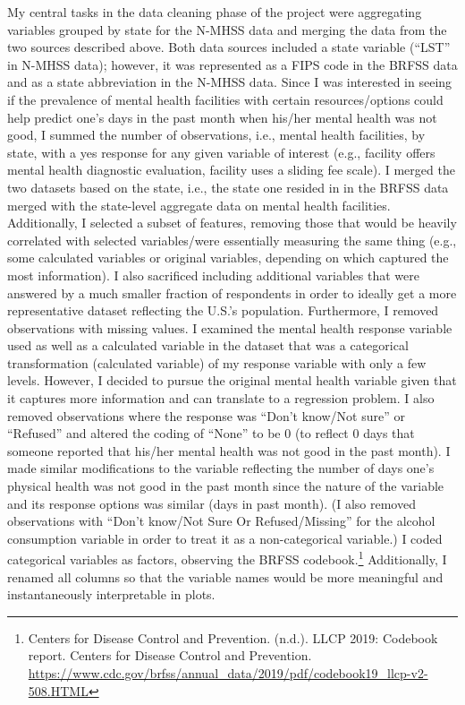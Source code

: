 \documentclass[
]{article}
\begin{document}
My central tasks in the data cleaning phase of the project were aggregating variables grouped by state for the N-MHSS data and merging the data from the two sources described above. Both data sources included a state variable (``LST'' in N-MHSS data); however, it was represented as a FIPS code in the BRFSS data and as a state abbreviation in the N-MHSS data. Since I was interested in seeing if the prevalence of mental health facilities with certain resources/options could help predict one's days in the past month when his/her mental health was not good, I summed the number of observations, i.e., mental health facilities, by state, with a yes response for any given variable of interest (e.g., facility offers mental health diagnostic evaluation, facility uses a sliding fee scale). I merged the two datasets based on the state, i.e., the state one resided in in the BRFSS data merged with the state-level aggregate data on mental health facilities. Additionally, I selected a subset of features, removing those that would be heavily correlated with selected variables/were essentially measuring the same thing (e.g., some calculated variables or original variables, depending on which captured the most information). I also sacrificed including additional variables that were answered by a much smaller fraction of respondents in order to ideally get a more representative dataset reflecting the U.S.'s population. Furthermore, I removed observations with missing values. I examined the mental health response variable used as well as a calculated variable in the dataset that was a categorical transformation (calculated variable) of my response variable with only a few levels. However, I decided to pursue the original mental health variable given that it captures more information and can translate to a regression problem. I also removed observations where the response was ``Don't know/Not sure'' or ``Refused'' and altered the coding of ``None'' to be 0 (to reflect 0 days that someone reported that his/her mental health was not good in the past month). I made similar modifications to the variable reflecting the number of days one's physical health was not good in the past month since the nature of the variable and its response options was similar (days in past month). (I also removed observations with ``Don't know/Not Sure Or Refused/Missing'' for the alcohol consumption variable in order to treat it as a non-categorical variable.) I coded categorical variables as factors, observing the BRFSS codebook.\footnote{Centers for Disease Control and Prevention. (n.d.). LLCP 2019: Codebook report. Centers for Disease Control and Prevention. \url{https://www.cdc.gov/brfss/annual_data/2019/pdf/codebook19_llcp-v2-508.HTML}} Additionally, I renamed all columns so that the variable names would be more meaningful and instantaneously interpretable in plots.
\end{document}
